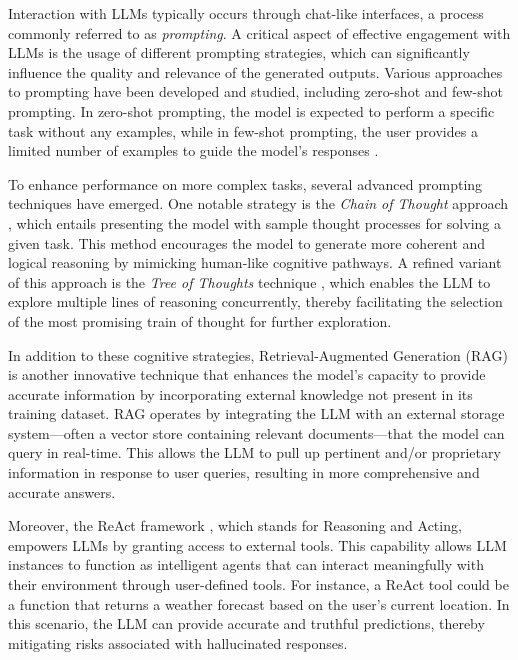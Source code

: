 \documentclass[
  a4paper,
]{scrreprt}
\theoremstyle{definition}
\theoremstyle{remark}
\begin{document}
Interaction with LLMs typically occurs through chat-like interfaces, a
process commonly referred to as \emph{prompting}. A critical aspect of
effective engagement with LLMs is the usage of different prompting
strategies, which can significantly influence the quality and relevance
of the generated outputs. Various approaches to prompting have been
developed and studied, including zero-shot and few-shot prompting. In
zero-shot prompting, the model is expected to perform a specific task
without any examples, while in few-shot prompting, the user provides a
limited number of examples to guide the model's responses
\autocite{brown2020}.

To enhance performance on more complex tasks, several advanced prompting
techniques have emerged. One notable strategy is the \emph{Chain of
Thought} approach \autocite{chainofthought}, which entails presenting
the model with sample thought processes for solving a given task. This
method encourages the model to generate more coherent and logical
reasoning by mimicking human-like cognitive pathways. A refined variant
of this approach is the \emph{Tree of Thoughts} technique
\autocite{yao2023}, which enables the LLM to explore multiple lines of
reasoning concurrently, thereby facilitating the selection of the most
promising train of thought for further exploration.

In addition to these cognitive strategies, Retrieval-Augmented
Generation (RAG) \autocite{lewis2021} is another innovative technique
that enhances the model's capacity to provide accurate information by
incorporating external knowledge not present in its training dataset.
RAG operates by integrating the LLM with an external storage
system---often a vector store containing relevant documents---that the
model can query in real-time. This allows the LLM to pull up pertinent
and/or proprietary information in response to user queries, resulting in
more comprehensive and accurate answers.

Moreover, the ReAct framework \autocite{reAct}, which stands for
Reasoning and Acting, empowers LLMs by granting access to external
tools. This capability allows LLM instances to function as intelligent
agents that can interact meaningfully with their environment through
user-defined tools. For instance, a ReAct tool could be a function that
returns a weather forecast based on the user's current location. In this
scenario, the LLM can provide accurate and truthful predictions, thereby
mitigating risks associated with hallucinated responses.
\end{document}

